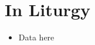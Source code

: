 \documentclass[14pt]{book}
\begin{document}
\chapter{In Liturgy}
\begin{multicols}{2}\begin{itemize}
		\item Data here
	\end{itemize}\end{multicols}
\end{document}
